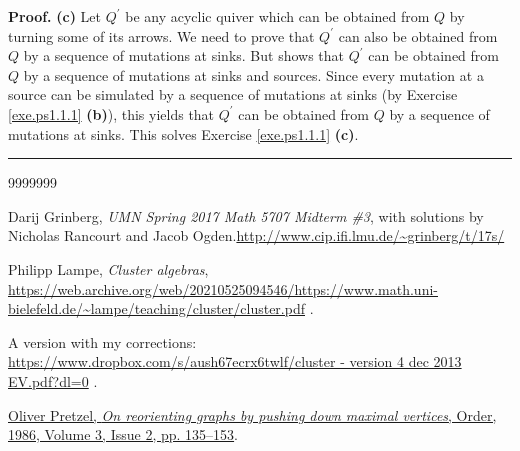 \documentclass[numbers=enddot,12pt,final,onecolumn,notitlepage]{scrartcl}%
\numberwithin{exer}{section}
\theoremstyle{definition}
\newenvironment{proof}[1][Proof]{\noindent\textbf{#1.} }{\ \rule{0.5em}{0.5em}}
\newenvironment{verlong}{}{}
\begin{document}
\begin{proof}
\textbf{(c)} Let $Q^{\prime}$ be any acyclic quiver which can be obtained from
$Q$ by turning some of its arrows. We need to prove that $Q^{\prime}$ can also
be obtained from $Q$ by a sequence of mutations at sinks. But \cite[proof of
Proposition 2.2.8]{Lampe} shows that $Q^{\prime}$ can be obtained from $Q$ by
a sequence of mutations at sinks and sources. Since every mutation at a source
can be simulated by a sequence of mutations at sinks (by Exercise
\ref{exe.ps1.1.1} \textbf{(b)}), this yields that $Q^{\prime}$ can be obtained
from $Q$ by a sequence of mutations at sinks. This solves Exercise
\ref{exe.ps1.1.1} \textbf{(c)}.
\end{proof}

\begin{thebibliography}{9999999}                                                                                          %


Darij Grinberg, \textit{UMN Spring 2017 Math 5707 Midterm
\#3}, with solutions by Nicholas Rancourt and Jacob Ogden.\newline\url{http://www.cip.ifi.lmu.de/~grinberg/t/17s/}

Philipp Lampe, \textit{Cluster algebras},\newline%
\url{https://web.archive.org/web/20210525094546/https://www.math.uni-bielefeld.de/~lampe/teaching/cluster/cluster.pdf}
.

\begin{verlong}
A version with my corrections:\newline%
\url{https://www.dropbox.com/s/aush67ecrx6twlf/cluster - version 4 dec 2013 EV.pdf?dl=0}
.
\end{verlong}

\href{https://doi.org/10.1007/BF00390104}{Oliver
Pretzel, \textit{On reorienting graphs by pushing down maximal vertices},
Order, 1986, Volume 3, Issue 2, pp. 135--153}.
\end{thebibliography}
\end{document}
